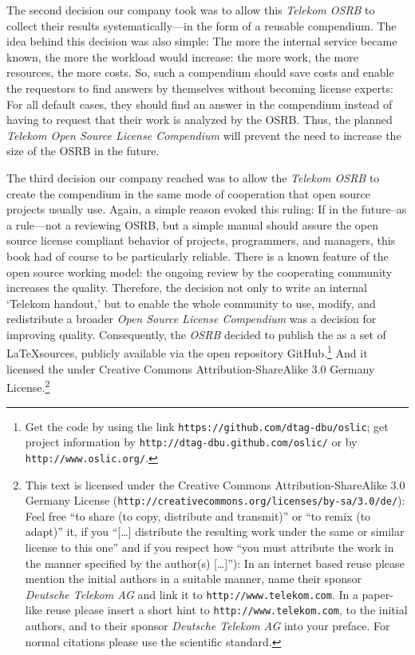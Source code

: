 The second decision our company took was to allow this \emph{Telekom OSRB} to
collect their results systematically---in the form of a reusable compendium.
The idea behind this decision was also simple: The more the internal service
became known, the more the workload would increase: the more work, the more
resources, the more costs. So, such a compendium should save costs and enable
the requestors to find answers by themselves without becoming license experts:
For all default cases, they should find an answer in the compendium instead of
having to request that their work is analyzed by the OSRB. Thus, the planned
\emph{Telekom Open Source License Compendium} will prevent the need
to increase the size of the OSRB in the future.

The third decision our company reached was to allow the \emph{Telekom OSRB} to
create the compendium in the same mode of cooperation that open source projects
usually use. Again, a simple reason evoked this ruling: If in the future--as a
rule---not a reviewing OSRB, but a simple manual should assure the open 
source license compliant behavior of projects, programmers, and managers, this
book had of course to be particularly reliable. There is a known feature of the
open source working model: the ongoing review by the cooperating community
increases the quality. Therefore, the decision not only to write an internal
`Telekom handout,' but to enable the whole community to use, modify, and 
redistribute a broader \emph{Open Source License Compendium} was a decision for
improving quality. Consequently, the \emph{OSRB} decided to publish the
\emph{\oslic} as a set of \LaTeX sources, publicly available via the open
repository GitHub.\footnote{Get the code by using the link
\texttt{https://github.com/dtag-dbu/oslic}; get project information by
\texttt{http://dtag-dbu.github.com/oslic/} or by
\texttt{http://www.oslic.org/}.}  And it licensed the \oslic{} under Creative
Commons Attribution-ShareAlike 3.0 Germany License.\footnote{ This text is
licensed under the Creative Commons Attribution-ShareAlike 3.0 Germany License
(\texttt{http://creativecommons.org/licenses/by-sa/3.0/de/}): Feel free
\enquote{to share (to copy, distribute and transmit)} or \enquote{to remix (to
adapt)} it, if you \enquote{[\ldots] distribute the resulting work under the
same or similar license to this one} and if you respect how \enquote{you must
attribute the work in the manner specified by the author(s) [\ldots]}):
In an internet based reuse please mention the initial authors in a suitable
manner, name their sponsor \textit{Deutsche Telekom AG} and link it to
\texttt{http://www.telekom.com}. In a paper-like reuse please insert a short
hint to \texttt{http://www.telekom.com}, to the initial authors, and to their
sponsor \textit{Deutsche Telekom AG} into your preface. For normal citations
please use the scientific standard.}

